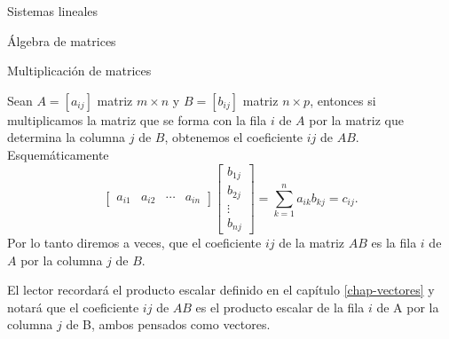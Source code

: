 \begin{chapter}{Sistemas lineales}
\begin{section}{\'Algebra de matrices}
\begin{subsection}{Multiplicaci\'on de matrices}
                \begin{obs}\label{mtrx-filasxcols}
                     Sean $A=[a_{ij}]$ matriz $m \times n$ y $B=[b_{ij}]$ matriz $n \times p$, entonces si 
                     multiplicamos la matriz que se forma con la fila $i$ de $A$ por la matriz que determina la columna $j$ de $B$, obtenemos el coeficiente $ij$ de $AB$.
                    Esquemáticamente
                    \begin{equation*}
                    \begin{bmatrix} a_{i1}& a_{i2}& \cdots &a_{in}\end{bmatrix}
                    \begin{bmatrix} b_{1j}\\ b_{2j}\\ \vdots \\b_{nj}\end{bmatrix} =  \sum_{k=1}^{n}a_{ik}b_{kj} = c_{ij}.
                    \end{equation*}
                    Por lo tanto diremos a veces, que el coeficiente $ij$ de la matriz $AB$ es la fila $i$ de $A$ por la columna $j$ de $B$. 
                    
                    El lector recordará el producto escalar definido en  el capítulo \ref{chap-vectores} y notará que el coeficiente $ij$ de $AB$ es el producto escalar de la fila $i$ de A por la columna $j$ de B, ambos pensados como vectores. 
                \end{obs}	
                

\end{subsection}
\end{section}
\end{chapter}
